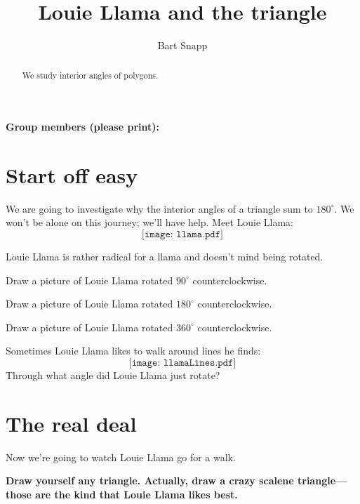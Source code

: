 \documentclass[handout,nooutcomes,noauthor]{ximera}
\title{Louie Llama and the triangle}
\author{Bart Snapp}
\begin{document}
\begin{abstract}
  We study interior angles of polygons.
\end{abstract}
\maketitle

\noindent\textbf{Group members (please print):}\ \hrulefill \\

\hrulefill



\section{Start off easy}

We are going to investigate why the interior angles of a triangle sum
to $180^\circ$. We won't be alone on this journey; we'll have help.
Meet Louie Llama:
\[
\texttt{[image: llama.pdf]}
\]

Louie Llama is rather radical for a llama and doesn't mind being
rotated.

\begin{problem} 
Draw a picture of Louie Llama rotated $90^\circ$ counterclockwise.
\end{problem}

\begin{problem}\label{P:180}
Draw a picture of Louie Llama rotated $180^\circ$ counterclockwise.
\end{problem}

\begin{problem} 
Draw a picture of Louie Llama rotated $360^\circ$ counterclockwise.
\end{problem}

\begin{problem}\label{P:lines}
  Sometimes Louie Llama likes to walk around lines he finds:
  \[
  \texttt{[image: llamaLines.pdf]}
  \]
  Through what angle did Louie Llama just rotate?
\end{problem}


\section{The real deal}

Now we're going to watch Louie Llama go for a walk.

\textbf{Draw yourself any triangle. Actually, draw a crazy scalene
triangle---those are the kind that Louie Llama likes best.}
\end{document}
